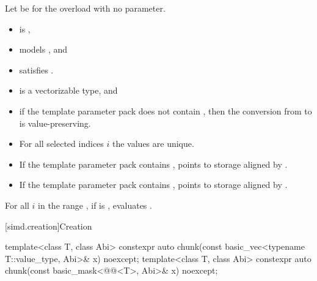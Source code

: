 \begin{itemdescr}
\pnum
Let  be  for the overload with
no  parameter.

\pnum
\constraints
\begin{itemize}
\item
{} is ,
\item
{} models
, and
\item
{} satisfies
.
\end{itemize}

\pnum
\mandates
\begin{itemize}
\item
{} is a vectorizable type, and
\item
if the template parameter pack  does not contain ,
then the conversion from 
to  is value-preserving.
\end{itemize}

\pnum
\expects
\begin{itemize}
\item
For all selected indices $i$ the values  are unique.
\item
If the template parameter pack  contains ,
 points to storage aligned by
.
\item
If the template parameter pack  contains
,
 points to storage aligned by .
\end{itemize}

\pnum
\effects
For all $i$ in the range , if  is , evaluates
.
\end{itemdescr}

[simd.creation]{Creation}

\begin{itemdecl}
template<class T, class Abi>
  constexpr auto chunk(const basic_vec<typename T::value_type, Abi>& x) noexcept;
template<class T, class Abi>
  constexpr auto chunk(const basic_mask<@@<T>, Abi>& x) noexcept;
\end{itemdecl}

